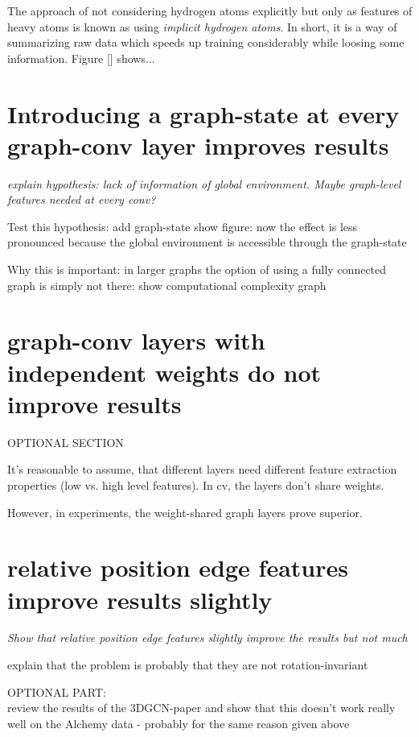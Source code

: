 The approach of not considering hydrogen atoms explicitly but only as features of heavy atoms is known as using \textit{implicit hydrogen atoms}. In short, it is a way of summarizing raw data which speeds up training considerably while loosing some information. Figure [] shows...



\section{Introducing a graph-state at every graph-conv layer improves results}



{\itshape
explain hypothesis:
lack of information of global environment. Maybe graph-level features needed at every conv?

Test this hypothesis:
add graph-state
show figure: now the effect is less pronounced because the global environment is accessible through the graph-state

Why this is important:
in larger graphs the option of using a fully connected graph is simply not there:
show computational complexity graph
}


\section{graph-conv layers with independent weights do not improve results}

{\itshape
	
OPTIONAL SECTION

It's reasonable to assume, that different layers need different feature extraction properties (low vs. high level features). In cv, the layers don't share weights.

However, in experiments, the weight-shared graph layers prove superior.
}

\section{relative position edge features improve results slightly}

{\itshape
 Show that relative position edge features slightly improve the results but not much
 
 explain that the problem is probably that they are not rotation-invariant
	
	
OPTIONAL PART:\\
review the results of the 3DGCN-paper and show that this doesn't work really well on the Alchemy data - probably for the same reason given above
}






